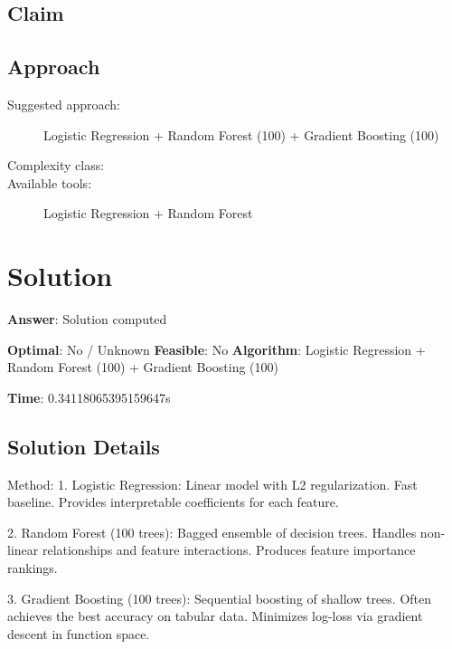 \documentclass[11pt, a4paper]{article}
\begin{document}
\subsection{Claim}


\subsection{Approach}

\begin{description}
  \item[Suggested approach:] Logistic Regression + Random Forest (100) + Gradient Boosting (100)
  \item[Complexity class:] 
  \item[Available tools:] Logistic Regression + Random Forest
\end{description}
\section{Solution}

\begin{polyaresult}

\textbf{Answer}: Solution computed


\textbf{Optimal}: No / Unknown \hfill
\textbf{Feasible}: No
\textbf{Algorithm}: Logistic Regression + Random Forest (100) + Gradient Boosting (100) \quad $$

\textbf{Time}: 0.34118065395159647s


\end{polyaresult}

\subsection{Solution Details}


Method: 1. Logistic Regression: Linear model with L2 regularization. Fast baseline. Provides interpretable coefficients for each feature.

2. Random Forest (100 trees): Bagged ensemble of decision trees. Handles non-linear relationships and feature interactions. Produces feature importance rankings.

3. Gradient Boosting (100 trees): Sequential boosting of shallow trees. Often achieves the best accuracy on tabular data. Minimizes log-loss via gradient descent in function space.
\end{document}
